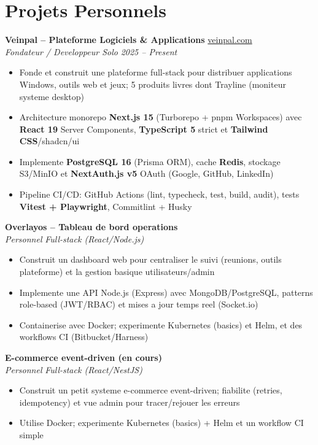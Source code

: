 \documentclass[10pt,a4paper]{article}
\begin{document}
\vspace{4pt}
\section*{Projets Personnels}
{\small
\textbf{Veinpal -- Plateforme Logiciels \& Applications} \hfill \href{https://veinpal.com}{veinpal.com}\\[1pt]
\textit{Fondateur / Developpeur Solo} \hfill \textit{2025 -- Present}
\begin{itemize}
  \item Fonde et construit une plateforme full-stack pour distribuer applications Windows, outils web et jeux; 5 produits livres dont Trayline (moniteur systeme desktop)
  \item Architecture monorepo \textbf{Next.js 15} (Turborepo + pnpm Workspaces) avec \textbf{React 19} Server Components, \textbf{TypeScript 5} strict et \textbf{Tailwind CSS}/shadcn/ui
  \item Implemente \textbf{PostgreSQL 16} (Prisma ORM), cache \textbf{Redis}, stockage S3/MinIO et \textbf{NextAuth.js v5} OAuth (Google, GitHub, LinkedIn)
  \item Pipeline CI/CD: GitHub Actions (lint, typecheck, test, build, audit), tests \textbf{Vitest + Playwright}, Commitlint + Husky
\end{itemize}

\vspace{2pt}
\textbf{Overlayos -- Tableau de bord operations}\\[1pt]
\textit{Personnel} \hfill \textit{Full-stack (React/Node.js)}
\begin{itemize}
  \item Construit un dashboard web pour centraliser le suivi (reunions, outils plateforme) et la gestion basique utilisateurs/admin
  \item Implemente une API Node.js (Express) avec MongoDB/PostgreSQL, patterns role-based (JWT/RBAC) et mises a jour temps reel (Socket.io)
  \item Containerise avec Docker; experimente Kubernetes (basics) et Helm, et des workflows CI (Bitbucket/Harness)
\end{itemize}

\vspace{2pt}
\textbf{E-commerce event-driven (en cours)}\\[1pt]
\textit{Personnel} \hfill \textit{Full-stack (React/NestJS)}
\begin{itemize}
  \item Construit un petit systeme e-commerce event-driven; fiabilite (retries, idempotency) et vue admin pour tracer/rejouer les erreurs
  \item Utilise Docker; experimente Kubernetes (basics) + Helm et un workflow CI simple
\end{itemize}

}
\end{document}
